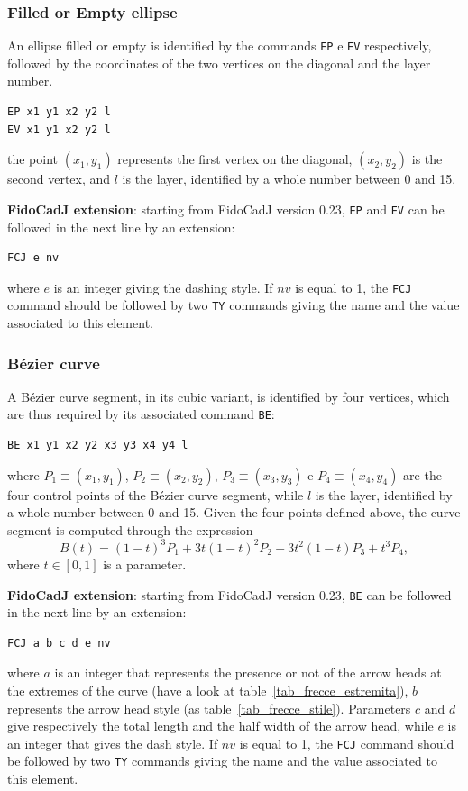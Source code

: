 \documentclass[10pt,a4paper,twoside]{scrreprt}
\begin{document}
\subsubsection{Filled or Empty ellipse}

An ellipse filled or empty is identified by the commands
\lstinline!EP! e \lstinline!EV! respectively,
followed by the coordinates of the two vertices on the diagonal and
the layer number.
\begin{lstlisting}
EP x1 y1 x2 y2 l
EV x1 y1 x2 y2 l
\end{lstlisting}
the point $(x_{1},y_{1})$ represents the first
vertex on the diagonal, $(x_{2},y_{2})$ is the second vertex, and
$l$ is the layer, identified by a whole number between 0 and 15.


\textbf{FidoCadJ extension}: starting from FidoCadJ version 0.23,  \lstinline!EP! and \lstinline!EV! can be followed in the next line by an extension:
\begin{lstlisting}
FCJ e nv
\end{lstlisting}
where $e$ is an integer giving the dashing style. If $nv$ is equal to 1, the \lstinline!FCJ! command should be followed by two \lstinline!TY! commands giving the name and the value associated to this element.


\subsubsection{B\'ezier curve}

A B\'ezier curve segment, in its cubic variant, is identified
by four vertices, which are thus required by its associated command
\lstinline!BE!:
\begin{lstlisting}
BE x1 y1 x2 y2 x3 y3 x4 y4 l
\end{lstlisting}
where $P_{1}\equiv(x_{1},y_{1})$, $P_{2}\equiv(x_{2},y_{2})$,
$P_{3}\equiv(x_{3},y_{3})$ e $P_{4}\equiv(x_{4},y_{4})$ are the
four control points of the B\'ezier curve segment, while
$l$ is the layer, identified by a whole number between 0 and 15.
Given the four points defined above, the curve segment is computed
through the expression \begin{equation}
B(t)=(1-t)^{3}P_{1}+3t(1-t)^{2}P_{2}+3t^{2}(1-t)P_{3}+t^{3}P_{4},\end{equation}
where $t\in[0,1]$ is a parameter.

\textbf{FidoCadJ extension}: starting from FidoCadJ version 0.23, \lstinline!BE! can be followed in the next line by an extension:
\begin{lstlisting}
FCJ a b c d e nv
\end{lstlisting}
where $a$ is an integer that represents the presence or not of the arrow heads at the extremes of the curve (have a look at table~\ref{tab_frecce_estremita}), $b$ represents the arrow head style (as table~\ref{tab_frecce_stile}). Parameters $c$ and $d$ give respectively the total length and the half width of the arrow head, while $e$ is an integer that gives the dash style. If $nv$ is equal to 1, the \lstinline!FCJ! command should be followed by two \lstinline!TY! commands giving the name and the value associated to this element.
\end{document}
